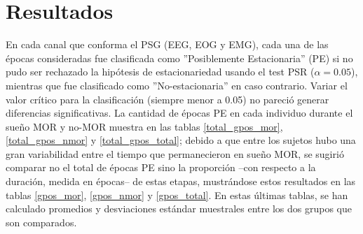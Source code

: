 \chapter{Resultados}

En cada canal que conforma el PSG (EEG, EOG y EMG), 
cada una de las \'epocas consideradas fue clasificada como 
''Posiblemente Estacionaria'' (PE) si no pudo ser rechazado la hip\'otesis de 
estacionariedad usando el test PSR ($\alpha = 0.05$), mientras que 
fue clasificado como ''No-estacionaria'' en caso contrario. Variar el valor cr\'itico
para la clasificaci\'on (siempre menor a 0.05) no pareci\'o generar diferencias significativas.
La cantidad de \'epocas PE en cada individuo 
durante el sue\~no MOR y no-MOR
muestra en las tablas \ref{total_gpos_mor}, \ref{total_gpos_nmor} y
\ref{total_gpos_total}; debido a que entre los sujetos hubo una gran variabilidad entre el tiempo 
que permanecieron en sue\~no MOR, se sugiri\'o comparar no el total de \'epocas PE sino
la proporci\'on --con respecto a la duraci\'on, medida en \'epocas-- de estas etapas, 
mustr\'andose estos resultados en las tablas \ref{gpos_mor}, \ref{gpos_nmor} y
\ref{gpos_total}. En estas \'ultimas tablas, se han calculado promedios y desviaciones
est\'andar muestrales entre los dos grupos que son comparados.


